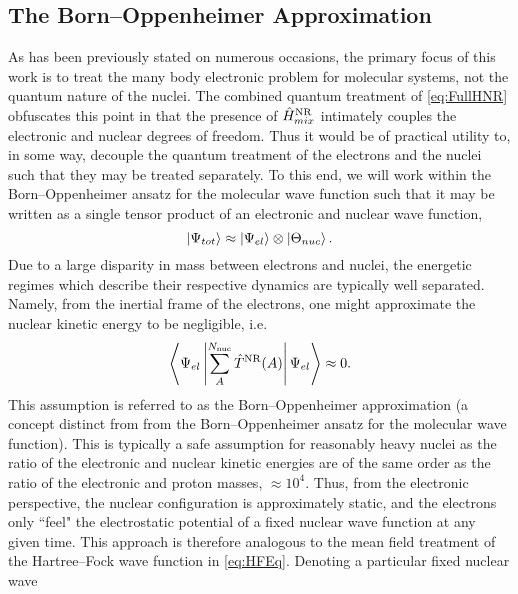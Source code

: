 \subsection{The Born--Oppenheimer Approximation}
\label{sec:BornOpp}

As has been previously stated on numerous occasions, the primary focus of this work is to treat the many body
electronic problem for molecular systems, not the quantum nature of the nuclei. The combined quantum treatment
of \cref{eq:FullHNR} obfuscates this point in that the presence of $\hat{H}^{\mathrm{NR}}_{mix}$ intimately couples the
electronic and nuclear degrees of freedom. Thus it would be of practical utility to, in some way, decouple
the quantum treatment of the electrons and the nuclei such that they may be treated separately. 
To this end, we will work within the Born--Oppenheimer ansatz for the molecular wave function \cite{Oppenheimer27_457,Tully98_407} such
that it may be written as a single tensor product of an electronic and nuclear wave function,
\begin{equation}
  \left\vert \Psi_{tot} \right\rangle \approx \left\vert \Psi_{el} \right\rangle \otimes \left\vert \Theta_{nuc} \right\rangle.
\end{equation}
Due to a large disparity in mass between electrons and nuclei, the energetic regimes which describe their respective
dynamics are typically well separated. Namely, from the inertial frame of the electrons, one might approximate
the nuclear kinetic energy to be negligible, i.e.
\begin{equation}
\left\langle \Psi_{el} \left\vert \sum_A^{N_\mathrm{nuc}} \hat{T}^{\mathrm{NR}}(A)  \right\vert \Psi_{el} \right\rangle \approx 0.
\end{equation}
This assumption is referred to as the Born--Oppenheimer approximation (a concept distinct from from the 
Born--Oppenheimer ansatz for the molecular wave function). This is typically a safe assumption for reasonably
heavy nuclei as the ratio of the electronic and nuclear kinetic energies are of the same order as
the ratio of the electronic and proton masses, $\approx 10^{4}$. Thus, from the electronic perspective,
the nuclear configuration is approximately static, and the electrons only ``feel" the electrostatic
potential of a fixed nuclear wave function at any given time. This approach is therefore analogous to
the mean field treatment of the Hartree--Fock wave function in \cref{eq:HFEq}. Denoting a particular fixed nuclear wave
